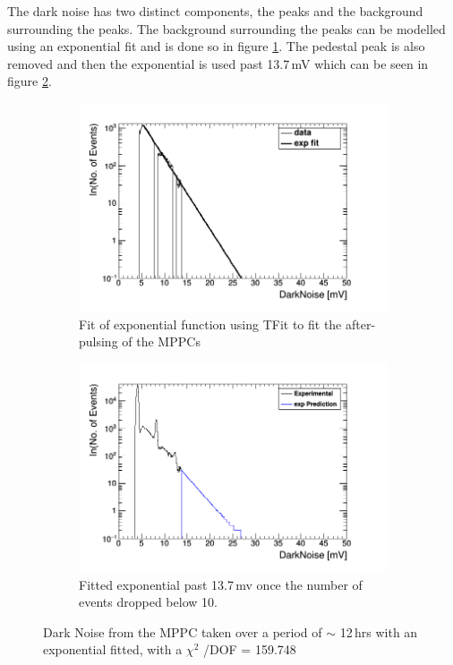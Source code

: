The dark noise has two distinct components, the peaks and the background surrounding the peaks. The background surrounding the peaks can be modelled using an exponential fit and is done so in figure \ref{subFig:expFitOfDark}. The pedestal peak is also removed and then the exponential is used past 13.7\,mV which can be seen in figure \ref{subFig:fittedDarkNoise}. 
\begin{figure}[H]
\centering
\begin{subfigure}{.5\textwidth}
  \centering
  \includegraphics[width=\linewidth]{fit_of_dark_noise.png}
  \captionsetup{width=.9\linewidth}
  \caption{Fit of exponential function using TFit to fit the after-pulsing of the MPPCs}
  \label{subFig:expFitOfDark}
\end{subfigure}%
\begin{subfigure}{.5\textwidth}
  \centering
  \includegraphics[width=\linewidth]{fittedDarkNoise_output.png}
  \captionsetup{width=.9\linewidth}
  \caption{Fitted exponential past 13.7\,mv once the number of events dropped below 10.}
  \label{subFig:fittedDarkNoise}
\end{subfigure}
\caption{Dark Noise from the MPPC taken over a period of $\sim$ 12\,hrs with an exponential fitted, with a $\chi ^2$ /DOF = 159.748}
\label{fig:fitting_of_non_peak_dark_noise}
\end{figure}

